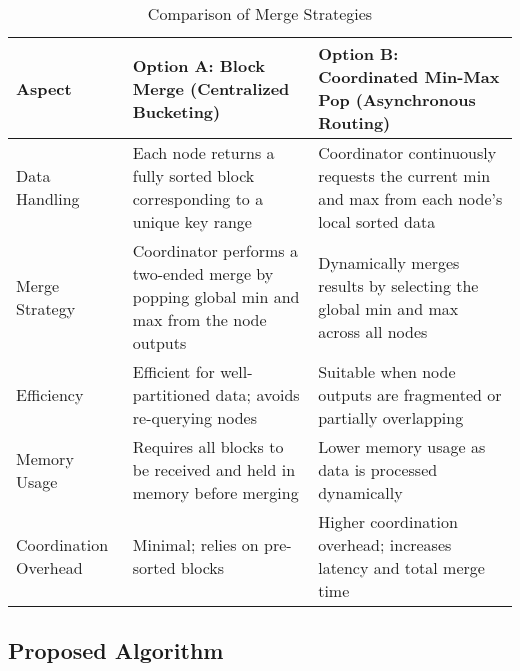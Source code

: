 \documentclass[]{interact}
\theoremstyle{plain}
\theoremstyle{definition}
\theoremstyle{remark}
\begin{document}
\begin{table}[H]
\centering
\renewcommand{\arraystretch}{1.5} %
\footnotesize
\begin{tabular}{|p{3cm}|p{5cm}|p{5cm}|}
\hline
\textbf{Aspect} & \textbf{Option A: Block Merge (Centralized Bucketing)} & \textbf{Option B: Coordinated Min-Max Pop (Asynchronous Routing)} \\ \hline
Data Handling & Each node returns a fully sorted block corresponding to a unique key range & Coordinator continuously requests the current min and max from each node's local sorted data \\ \hline
Merge Strategy & Coordinator performs a two-ended merge by popping global min and max from the node outputs & Dynamically merges results by selecting the global min and max across all nodes \\ \hline
Efficiency & Efficient for well-partitioned data; avoids re-querying nodes & Suitable when node outputs are fragmented or partially overlapping \\ \hline
Memory Usage & Requires all blocks to be received and held in memory before merging & Lower memory usage as data is processed dynamically \\ \hline
Coordination Overhead & Minimal; relies on pre-sorted blocks & Higher coordination overhead; increases latency and total merge time \\ \hline
\end{tabular}
\caption{Comparison of Merge Strategies}
\end{table}


\subsection{Proposed Algorithm}
\end{document}
